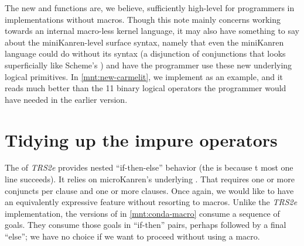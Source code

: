\documentclass[runningheads,natbib=false]{llncs}
\begin{document}

The new  and  functions are, we
believe, sufficiently high-level for programmers in implementations
without macros. Though this note mainly concerns working towards an
internal macro-less kernel language, it may also have something to say
about the miniKanren-level surface syntax, namely that even the
miniKanren language could do without its  syntax (a
disjunction of conjunctions that looks superficially like
Scheme's ) and have the programmer use these new
underlying logical primitives. In \cref{mnt:new-carmelit}, we
implement  as an example, and it reads
much better than the 11 binary logical operators the programmer would
have needed in the earlier version.


\section{Tidying up the impure operators}\label{sec:impure}

The  of \emph{TRS2e} provides nested
\enquote{if-then-else} behavior (the  is because
t most one line succeeds). It relies on microKanren's
underlying . That  requires one or
more conjuncts per clause and one or more clauses. Once again, we
would like to have an equivalently expressive feature without
resorting to macros. Unlike the \emph{TRS2e} implementation, the
versions of  in \cref{mnt:conda-macro} consume a
sequence of goals. They consume those goals in \enquote{if-then}
pairs, perhaps followed by a final \enquote{else}; we have no choice
if we want to proceed without using a macro.
\end{document}

